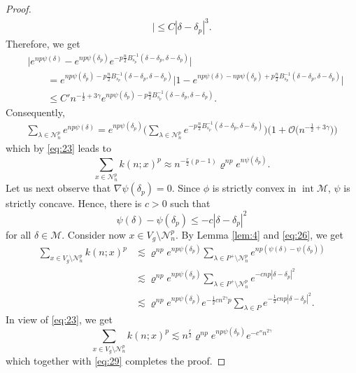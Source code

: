 \documentclass[11pt]{amsart}
\newcommand{\calO}{\mathcal{O}}
\newcommand{\calM}{\mathcal{M}}
\newcommand{\calN}{\mathcal{N}}
\newcommand{\scrN}{\mathscr{N}}
\newcommand{\inter}{\operatorname{int}}
\theoremstyle{plain}
\theoremstyle{definition}
\numberwithin{equation}{section}
\begin{document}
\begin{proof}
\begin{align*}
		\Big|
		\leqslant
		C
		|\delta - \delta_p|^3.
	\end{align*}
	Therefore, we get
	\begin{align*}
		&
		\Big|e^{n p \psi(\delta)} - e^{n p \psi(\delta_p)} 
		e^{-p \frac{n}{2} B^{-1}_{s_p}(\delta - \delta_p, \delta-\delta_p)}
		\Big| \\
		&\qquad=
		e^{n p \psi(\delta_p) - p \frac{n}{2} B^{-1}_{s_p}(\delta - \delta_p, \delta-\delta_p)}
		\Big|1 - e^{n p \psi(\delta) - n p \psi(\delta_p) + p \frac{n}{2} B^{-1}_{s_p}(\delta - \delta_p, \delta-\delta_p)} \Big|
		\\
		&\qquad\leqslant
		C' n^{-\frac{1}{2} + 3 \gamma} e^{n p \psi(\delta_p) - p \frac{n}{2} B^{-1}_{s_p}(\delta - \delta_p, \delta-\delta_p)}.
	\end{align*}
	Consequently,
	\begin{align*}
		\sum_{\lambda \in \calN_n^p}
		e^{n p \psi(\delta)} 
		=
		e^{n p \psi(\delta_p)}
		\bigg(\sum_{\lambda \in \calN_n^p}
		e^{-p \frac{n}{2} B^{-1}_{s_p}(\delta - \delta_p, \delta-\delta_p)} \bigg)
		\Big(1 + \calO\big(n^{-\frac{1}{2}+3\gamma}\big)\Big)
	\end{align*}
	which by \eqref{eq:23} leads to
	\begin{equation}
		\label{eq:29}
		\sum_{x \in \scrN_n^p} k(n; x)^p
		\approx
		n^{-\frac{r}{2}(p-1)} \varrho^{np}
		e^{n\psi(\delta_p)}.
	\end{equation}
	Let us next observe that $\nabla \psi(\delta_p) = 0$. Since $\phi$ is strictly convex in $\inter \calM$, $\psi$ is 
	strictly concave. Hence, there is $c > 0$ such that
	\begin{equation}
		\label{eq:26}
		\psi(\delta)-\psi(\delta_p) \leqslant -c |\delta-\delta_p|^2
	\end{equation}
	for all $\delta \in \calM$. Consider now $x \in V_g \setminus \scrN_n^p$. By Lemma \ref{lem:4} and \eqref{eq:26}, we get
	\begin{align*}
		\sum_{x \in V_g\setminus \scrN_n^p} k(n; x)^p
		&\lesssim
		\varrho^{n p} e^{n p \psi(\delta_p)} 
		\sum_{\lambda \in P^+ \setminus \calN_n^p}
		e^{n p (\psi(\delta) - \psi(\delta_p))} \\
		&\lesssim
		\varrho^{n p} e^{n p \psi(\delta_p)} 
		\sum_{\lambda \in P^+ \setminus \calN_n^p}
		e^{-c n p|\delta-\delta_p|^2} \\
		&\lesssim \varrho^{n p} e^{np\psi(\delta_p)} e^{-\frac{1}{2} cn^{2\gamma} p }
		\sum_{\lambda \in P} e^{-\frac{1}{2} c n p |\delta - \delta_p|^2}.
	\end{align*}
	In view of \eqref{eq:23}, we get
	\[
		\sum_{x \in V_g \setminus \scrN_n^p} k(n; x)^p
		\lesssim
		n^{\frac{r}{2}} \varrho^{n p} e^{np\psi(\delta_p)} e^{-c'' n^{2\gamma}}
	\]
	which together with \eqref{eq:29} completes the proof.
\end{proof}
\end{document}
